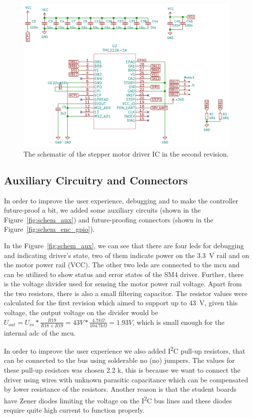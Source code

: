 \begin{figure}[H]
    \centering
    \includegraphics[width=\textwidth]{obrazky/schem_driver_rev2}
    \caption{The schematic of the stepper motor driver IC in the second revision.}
    \label{fig:schem_driver2}
\end{figure}

\subsection{Auxiliary Circuitry and Connectors}
\label{subsec:aux_connectors}
In order to improve the user experience, debugging and to make the controller future-proof a bit, we added some auxiliary circuits (shown in the Figure~\ref{fig:schem_aux}) and future-proofing connectors (shown in the Figure~\ref{fig:schem_enc_gpio}).

In the Figure~\ref{fig:schem_aux}, we can see that there are four \acs{led}s for debugging and indicating driver's state, two of them indicate power on the 3.3~V rail and on the motor power rail (VCC).
The other two \acs{led}s are connected to the \acs{mcu} and can be utilized to show status and error states of the SM4 driver.
Further, there is the voltage divider used for sensing the motor power rail voltage.
Apart from the two resistors, there is also a small filtering capacitor.
The resistor values were calculated for the first revision which aimed to support up to 43~V, given this voltage, the output voltage on the divider would be $U_{out} = U_{in} * \frac{R19}{R18+R19} = 43 V * \frac{4.7 k\Omega}{104.7 k\Omega} = 1.93 V$, which is small enough for the internal \acs{adc} of the \acs{mcu}.

In order to improve the user experience we also added I\textsuperscript{2}C pull-up resistors, that can be connected to the bus using solderable \acs{no} (\acl{no}) jumpers.
The values for these pull-up resistors was chosen 2.2 k\textohm, this is because we want to connect the driver using wires with unknown parasitic capacitance which can be compensated by lower resistance of the resistors.
Another reason is that the student boards have Zener diodes limiting the voltage on the I\textsuperscript{2}C bus lines and these diodes require quite high current to function properly.


